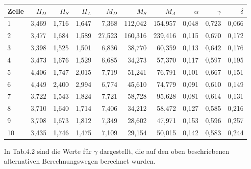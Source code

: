 \begin{center}
    \centering
\begin{tabular}{lrrrrrrrrr}
    \toprule
    Zelle &  $H_D$ &  $H_S$ &  $H_A$ &   $M_D$ &    $M_S$ &    $M_A$ &  $\alpha$ &  $\gamma$ &  $\delta$ \\
    \midrule
    1     & 3,469 & 1,716 & 1,647 &  7,368 & 112,042 & 154,957 &  0,048 &  0,723 &  0,066 \\
    2     & 3,477 & 1,684 & 1,589 & 27,523 & 160,316 & 239,416 &  0,115 &  0,670 &  0,172 \\
    3     & 3,398 & 1,525 & 1,501 &  6,836 &  38,770 &  60,359 &  0,113 &  0,642 &  0,176 \\
    4     & 3,473 & 1,676 & 1,529 &  6,685 &  34,273 &  57,370 &  0,117 &  0,597 &  0,195 \\
    5     & 4,406 & 1,747 & 2,015 &  7,719 &  51,241 &  76,791 &  0,101 &  0,667 &  0,151 \\
    6     & 4,449 & 2,400 & 2,994 &  6,774 &  45,610 &  74,779 &  0,091 &  0,610 &  0,149 \\
    7     & 3,722 & 1,543 & 1,824 &  7,721 &  58,728 &  95,628 &  0,081 &  0,614 &  0,131 \\
    8     & 3,710 & 1,640 & 1,714 &  7,406 &  34,212 &  58,472 &  0,127 &  0,585 &  0,216 \\
    9     & 3,708 & 1,673 & 1,812 &  7,349 &  28,602 &  47,971 &  0,153 &  0,596 &  0,257 \\
    10    & 3,435 & 1,746 & 1,475 &  7,109 &  29,154 &  50,015 &  0,142 &  0,583 &  0,244 \\
    \bottomrule
\end{tabular}
\label{tab:YFP1}
\end{center}

In Tab.4.2 sind die Werte für $\gamma$ dargestellt, die auf den oben beschriebenen alternativen Berechnungswegen berechnet 
wurden.


